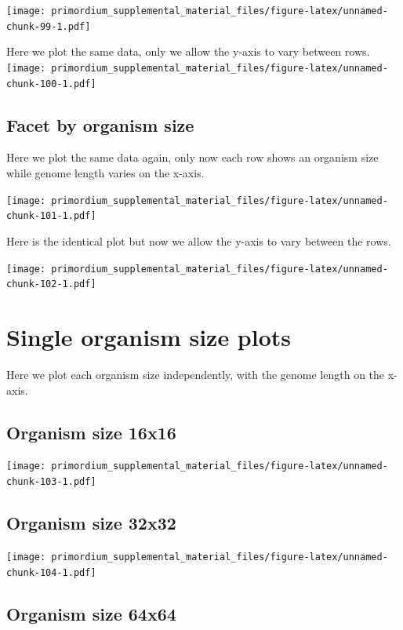 \documentclass[
]{book}
\begin{document}
\texttt{[image: primordium\_supplemental\_material\_files/figure-latex/unnamed-chunk-99-1.pdf]}

Here we plot the same data, only we allow the y-axis to vary between rows.
\texttt{[image: primordium\_supplemental\_material\_files/figure-latex/unnamed-chunk-100-1.pdf]}

\hypertarget{facet-by-organism-size-3}{%
\subsection{Facet by organism size}\label{facet-by-organism-size-3}}

Here we plot the same data again, only now each row shows an organism size while genome length varies on the x-axis.

\texttt{[image: primordium\_supplemental\_material\_files/figure-latex/unnamed-chunk-101-1.pdf]}

Here is the identical plot but now we allow the y-axis to vary between the rows.

\texttt{[image: primordium\_supplemental\_material\_files/figure-latex/unnamed-chunk-102-1.pdf]}

\hypertarget{single-organism-size-plots-4}{%
\section{Single organism size plots}\label{single-organism-size-plots-4}}

Here we plot each organism size independently, with the genome length on the x-axis.

\hypertarget{organism-size-16x16-3}{%
\subsection{Organism size 16x16}\label{organism-size-16x16-3}}

\texttt{[image: primordium\_supplemental\_material\_files/figure-latex/unnamed-chunk-103-1.pdf]}

\hypertarget{organism-size-32x32-3}{%
\subsection{Organism size 32x32}\label{organism-size-32x32-3}}

\texttt{[image: primordium\_supplemental\_material\_files/figure-latex/unnamed-chunk-104-1.pdf]}

\hypertarget{organism-size-64x64-3}{%
\subsection{Organism size 64x64}\label{organism-size-64x64-3}}
\end{document}
